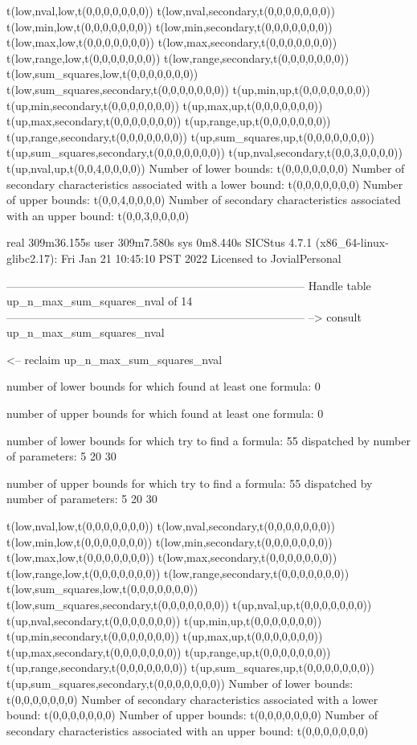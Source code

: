 t(low,nval,low,t(0,0,0,0,0,0,0))
t(low,nval,secondary,t(0,0,0,0,0,0,0))
t(low,min,low,t(0,0,0,0,0,0,0))
t(low,min,secondary,t(0,0,0,0,0,0,0))
t(low,max,low,t(0,0,0,0,0,0,0))
t(low,max,secondary,t(0,0,0,0,0,0,0))
t(low,range,low,t(0,0,0,0,0,0,0))
t(low,range,secondary,t(0,0,0,0,0,0,0))
t(low,sum_squares,low,t(0,0,0,0,0,0,0))
t(low,sum_squares,secondary,t(0,0,0,0,0,0,0))
t(up,min,up,t(0,0,0,0,0,0,0))
t(up,min,secondary,t(0,0,0,0,0,0,0))
t(up,max,up,t(0,0,0,0,0,0,0))
t(up,max,secondary,t(0,0,0,0,0,0,0))
t(up,range,up,t(0,0,0,0,0,0,0))
t(up,range,secondary,t(0,0,0,0,0,0,0))
t(up,sum_squares,up,t(0,0,0,0,0,0,0))
t(up,sum_squares,secondary,t(0,0,0,0,0,0,0))
t(up,nval,secondary,t(0,0,3,0,0,0,0))
t(up,nval,up,t(0,0,4,0,0,0,0))
Number of lower bounds:                                             t(0,0,0,0,0,0,0)
Number of secondary characteristics associated with a lower bound:  t(0,0,0,0,0,0,0)
Number of upper bounds:                                             t(0,0,4,0,0,0,0)
Number of secondary characteristics associated with an upper bound: t(0,0,3,0,0,0,0)

real	309m36.155s
user	309m7.580s
sys	0m8.440s
SICStus 4.7.1 (x86_64-linux-glibc2.17): Fri Jan 21 10:45:10 PST 2022
Licensed to JovialPersonal


--------------------------------------------------------------------------------
Handle table up_n_max_sum_squares_nval of 14
--------------------------------------------------------------------------------
--> consult up_n_max_sum_squares_nval

<-- reclaim up_n_max_sum_squares_nval

number of lower bounds for which found at least one formula: 0

number of upper bounds for which found at least one formula: 0

number of lower bounds for which try to find a formula: 55
dispatched by number of parameters: 5  20  30

number of upper bounds for which try to find a formula: 55
dispatched by number of parameters: 5  20  30

t(low,nval,low,t(0,0,0,0,0,0,0))
t(low,nval,secondary,t(0,0,0,0,0,0,0))
t(low,min,low,t(0,0,0,0,0,0,0))
t(low,min,secondary,t(0,0,0,0,0,0,0))
t(low,max,low,t(0,0,0,0,0,0,0))
t(low,max,secondary,t(0,0,0,0,0,0,0))
t(low,range,low,t(0,0,0,0,0,0,0))
t(low,range,secondary,t(0,0,0,0,0,0,0))
t(low,sum_squares,low,t(0,0,0,0,0,0,0))
t(low,sum_squares,secondary,t(0,0,0,0,0,0,0))
t(up,nval,up,t(0,0,0,0,0,0,0))
t(up,nval,secondary,t(0,0,0,0,0,0,0))
t(up,min,up,t(0,0,0,0,0,0,0))
t(up,min,secondary,t(0,0,0,0,0,0,0))
t(up,max,up,t(0,0,0,0,0,0,0))
t(up,max,secondary,t(0,0,0,0,0,0,0))
t(up,range,up,t(0,0,0,0,0,0,0))
t(up,range,secondary,t(0,0,0,0,0,0,0))
t(up,sum_squares,up,t(0,0,0,0,0,0,0))
t(up,sum_squares,secondary,t(0,0,0,0,0,0,0))
Number of lower bounds:                                             t(0,0,0,0,0,0,0)
Number of secondary characteristics associated with a lower bound:  t(0,0,0,0,0,0,0)
Number of upper bounds:                                             t(0,0,0,0,0,0,0)
Number of secondary characteristics associated with an upper bound: t(0,0,0,0,0,0,0)

